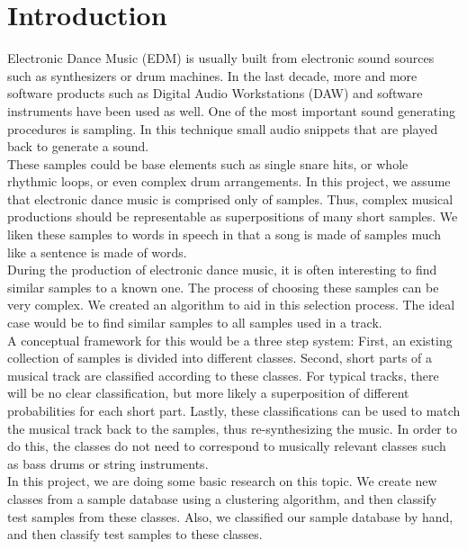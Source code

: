 \section{Introduction}
\label{sec:Introduction}
Electronic Dance Music (EDM) is usually built from electronic sound sources such as synthesizers or drum machines. In the last decade, more and more software products such as Digital Audio Workstations (DAW) and software instruments have been used as well. One of the most important sound generating procedures is sampling. In this technique small audio snippets that are played back to generate a sound.\\
These samples could be base elements such as single snare hits, or whole rhythmic loops, or even complex drum arrangements. In this project, we assume that electronic dance music is comprised only of samples. Thus, complex musical productions should be representable as superpositions of many short samples. We liken these samples to words in speech in that a song is made of samples much like a sentence is made of words.\\
During the production of electronic dance music, it is often interesting to find similar samples to a known one. The process of choosing these samples can be very complex. We created an algorithm to aid in this selection process. The ideal case would be to find similar samples to all samples used in a track. \\
A conceptual framework for this would be a three step system: First, an existing collection of samples is divided into different classes. Second, short parts of a musical track are classified according to these classes. For typical tracks, there will be no clear classification, but more likely a superposition of different probabilities for each short part. Lastly, these classifications can be used to match the musical track back to the samples, thus re-synthesizing the music. In order to do this, the classes do not need to correspond to musically relevant classes such as bass drums or string instruments.\\
In this project, we are doing some basic research on this topic. We create new classes from a sample database using a clustering algorithm, and then classify test samples from these classes. Also, we classified our sample database by hand, and then classify test samples to these classes.
